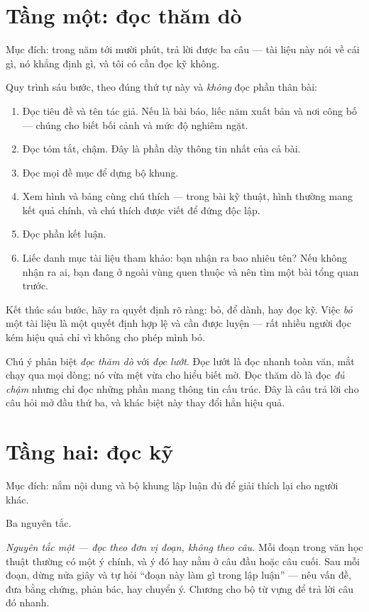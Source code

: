 \documentclass[../../english.tex]{subfiles}
\begin{document}
\section{Tầng một: đọc thăm dò}

Mục đích: trong năm tới mười phút, trả lời được ba câu --- tài liệu này nói về cái gì, nó khẳng định gì, và tôi có cần đọc kỹ không.

Quy trình sáu bước, theo đúng thứ tự này và \emph{không} đọc phần thân bài:

\begin{enumerate}
\item Đọc tiêu đề và tên tác giả. Nếu là bài báo, liếc năm xuất bản và nơi công bố --- chúng cho biết bối cảnh và mức độ nghiêm ngặt.
\item Đọc tóm tắt, chậm. Đây là phần dày thông tin nhất của cả bài.
\item Đọc mọi đề mục để dựng bộ khung.
\item Xem hình và bảng cùng chú thích --- trong bài kỹ thuật, hình thường mang kết quả chính, và chú thích được viết để đứng độc lập.
\item Đọc phần kết luận.
\item Liếc danh mục tài liệu tham khảo: bạn nhận ra bao nhiêu tên? Nếu không nhận ra ai, bạn đang ở ngoài vùng quen thuộc và nên tìm một bài tổng quan trước.
\end{enumerate}

Kết thúc sáu bước, hãy ra quyết định rõ ràng: bỏ, để dành, hay đọc kỹ. Việc \emph{bỏ} một tài liệu là một quyết định hợp lệ và cần được luyện --- rất nhiều người đọc kém hiệu quả chỉ vì không cho phép mình bỏ.

Chú ý phân biệt \emph{đọc thăm dò} với \emph{đọc lướt}. Đọc lướt là đọc nhanh toàn văn, mắt chạy qua mọi dòng; nó vừa mệt vừa cho hiểu biết mờ. Đọc thăm dò là đọc \emph{đủ chậm} nhưng chỉ đọc những phần mang thông tin cấu trúc. Đây là câu trả lời cho câu hỏi mở đầu thứ ba, và khác biệt này thay đổi hẳn hiệu quả.

\section{Tầng hai: đọc kỹ}

Mục đích: nắm nội dung và bộ khung lập luận đủ để giải thích lại cho người khác.

Ba nguyên tắc.

\emph{Nguyên tắc một --- đọc theo đơn vị đoạn, không theo câu.} Mỗi đoạn trong văn học thuật thường có một ý chính, và ý đó hay nằm ở câu đầu hoặc câu cuối. Sau mỗi đoạn, dừng nửa giây và tự hỏi ``đoạn này làm gì trong lập luận'' --- nêu vấn đề, đưa bằng chứng, phản bác, hay chuyển ý. Chương  cho bộ từ vựng để trả lời câu đó nhanh.
\end{document}
